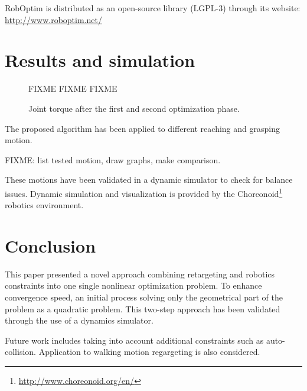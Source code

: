 \documentclass[letterpaper, 10 pt, conference]{ieeeconf}  %
\begin{document}
RobOptim is distributed as an open-source library (\mbox{LGPL-3}) through its
website: \url{http://www.roboptim.net/}



\section{Results and simulation}
\label{sec:results}


\begin{figure}[htbp!]
  FIXME FIXME FIXME
  \label{fig:results-torque}
  \caption{Joint torque after the first and second optimization
    phase.}
\end{figure}



The proposed algorithm has been applied to different reaching and
grasping motion.


FIXME: list tested motion, draw graphs, make comparison.


These motions have been validated in a dynamic simulator to check for
balance issues. Dynamic simulation and visualization is provided by
the Choreonoid\footnote{\url{http://www.choreonoid.org/en/}} robotics
environment.



\section{Conclusion}
\label{sec:conclusion}

This paper presented a novel approach combining retargeting and
robotics constraints into one single nonlinear optimization
problem. To enhance convergence speed, an initial process solving only
the geometrical part of the problem as a quadratic problem. This
two-step approach has been validated through the use of a dynamics
simulator.

Future work includes taking into account additional constraints such
as auto-collision. Application to walking motion regargeting is also
considered.

\end{document}

